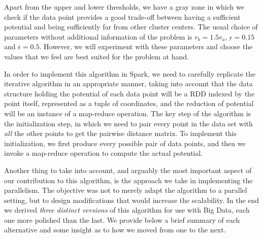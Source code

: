 Apart from the upper and lower thresholds, we have a gray zone in which we check if the data point provides a good trade-off between having a sufficient potential and being sufficiently far from other cluster centers. The usual choice of parameters without additional information of the problem is $r_b=1.5r_a$, $\underbar{\epsilon}=0.15$ and $\overbar{\epsilon}=0.5$. However, we will experiment with these parameters and choose the values that we feel are best suited for the problem at hand.

In order to implement this algorithm in Spark, we need to carefully replicate the iterative algorithm in an appropriate manner, taking into account that the data structure holding the potential of each data point will be a RDD indexed by the point itself, represented as a tuple of coordinates, and the reduction of potential will be an instance of a map-reduce operation. The key step of the algorithm is the initialization step, in which we need to pair every point in the data set with \textit{all} the other points to get the pairwise distance matrix. To implement this initialization, we first produce every possible pair of data points, and then we invoke a map-reduce operation to compute the actual potential.

Another thing to take into account, and arguably the most important aspect of our contribution to this algorithm, is the approach we take in implementing the parallelism. The objective was not to merely adapt the algorithm to a parallel setting, but to design modifications that would increase the scalability. In the end we derived \textit{three distinct versions} of this algorithm for use with Big Data, each one more polished than the last. We provide below a brief summary of each alternative and some insight as to how we moved from one to the next.

